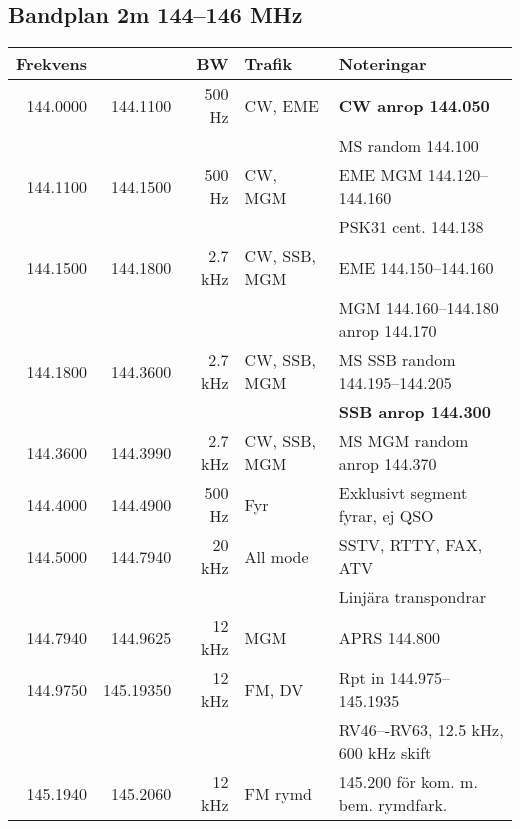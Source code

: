 \subsection{Bandplan 2m 144--146 MHz}
\begin{tabular}{rrrll}

\textbf{Frekvens} &  & \textbf{BW} & \textbf{Trafik} & \textbf{Noteringar} \\ \hline

144.0000 & 144.1100  & 500 Hz  & CW, EME      & \textbf{CW anrop 144.050}               \\
         &           &         &              & MS random 144.100                       \\ \hline
144.1100 & 144.1500  & 500 Hz  & CW, MGM      & EME MGM 144.120--144.160                \\
         &           &         &              & PSK31 cent. 144.138                     \\ \hline
144.1500 & 144.1800  & 2.7 kHz & CW, SSB, MGM & EME 144.150--144.160                    \\
         &           &         &              & MGM 144.160--144.180 anrop 144.170      \\ \hline
144.1800 & 144.3600  & 2.7 kHz & CW, SSB, MGM & MS SSB random 144.195--144.205          \\
         &           &         &              & \textbf{SSB anrop 144.300}              \\ \hline
144.3600 & 144.3990  & 2.7 kHz & CW, SSB, MGM & MS MGM random anrop 144.370             \\ \hline
144.4000 & 144.4900  & 500 Hz  & Fyr          & Exklusivt segment fyrar, ej QSO         \\ \hline
144.5000 & 144.7940  & 20 kHz  & All mode     & SSTV, RTTY, FAX, ATV                    \\
         &           &         &              & Linjära transpondrar                    \\ \hline
144.7940 & 144.9625  & 12 kHz  & MGM          & APRS 144.800                            \\ \hline
144.9750 & 145.19350 & 12 kHz  & FM, DV       & Rpt in 144.975--145.1935                \\
         &           &         &              & RV46–-RV63, 12.5 kHz, 600 kHz skift     \\ \hline
145.1940 & 145.2060  & 12 kHz  & FM rymd      & 145.200 för kom. m. bem. rymdfark.      \\ \hline

\end{tabular}
